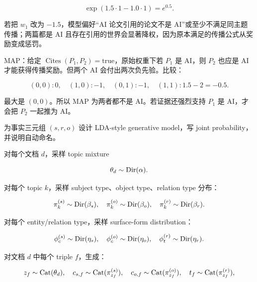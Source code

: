 \[
  \exp(1.5\cdot 1-1.0\cdot 1)=e^{0.5}.
\]

若把 \(w_1\) 改为 \(-1.5\)，模型偏好“AI 论文引用的论文不是 AI”或至少不满足同主题传播；两篇都是 AI 且存在引用的世界会显著降权，因为原本满足的传播公式从奖励变成惩罚。

MAP：给定 \(\operatorname{Cites}(P_1,P_2)=\mathrm{true}\)，原始权重下若 \(P_1\) 是 AI，则 \(P_2\) 也应是 AI 才能获得传播奖励。但两个 AI 会付出两次负先验。比较：

\[
  (0,0):0,\quad
  (1,0):-1,\quad
  (0,1):-1,\quad
  (1,1):1.5-2=-0.5.
\]

最大是 \((0,0)\)。所以 MAP 为两者都不是 AI。若证据还强烈支持 \(P_1\) 是 AI，才会把 \(P_2\) 一起推为 AI。

\begin{examproblem}
为事实三元组 \((s,r,o)\) 设计 LDA-style generative model，写 joint probability，并说明自动命名。
\end{examproblem}

\solution
对每个文档 \(d\)，采样 topic mixture

\[
  \theta_d\sim \operatorname{Dir}(\alpha).
\]

对每个 topic \(k\)，采样 subject type、object type、relation type 分布：

\[
  \pi_k^{(s)}\sim\operatorname{Dir}(\beta_s),
  \quad
  \pi_k^{(o)}\sim\operatorname{Dir}(\beta_o),
  \quad
  \pi_k^{(r)}\sim\operatorname{Dir}(\beta_r).
\]

对每个 entity/relation type，采样 surface-form distribution：

\[
  \phi_c^{(s)}\sim\operatorname{Dir}(\eta_s),
  \quad
  \phi_c^{(o)}\sim\operatorname{Dir}(\eta_o),
  \quad
  \phi_t^{(r)}\sim\operatorname{Dir}(\eta_r).
\]

对文档 \(d\) 中每个 triple \(f\)，生成：

\[
  z_f\sim\operatorname{Cat}(\theta_d),
  \quad
  c_{s,f}\sim\operatorname{Cat}(\pi_{z_f}^{(s)}),
  \quad
  c_{o,f}\sim\operatorname{Cat}(\pi_{z_f}^{(o)}),
  \quad
  t_f\sim\operatorname{Cat}(\pi_{z_f}^{(r)}),
\]

